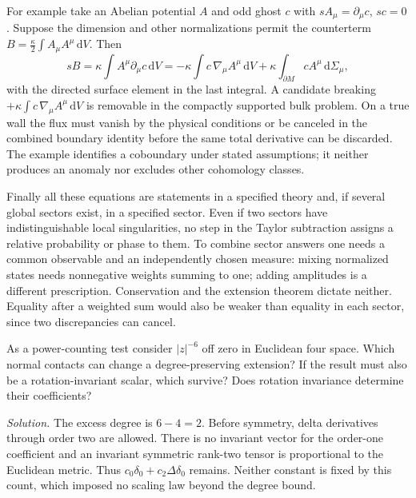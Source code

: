 For example take an Abelian potential $A$ and odd ghost $c$ with
$sA_\mu=\partial_\mu c$, $sc=0$. Suppose the dimension and other
normalizations permit the counterterm $B=\tfrac\kappa2\int A_\mu A^\mu\,\mathrm{d}V$.
Then
\[
 sB=\kappa\int A^\mu\partial_\mu c\,\mathrm{d}V
   =-\kappa\int c\,\nabla_\mu A^\mu\,\mathrm{d}V
      +\kappa\int_{\partial M} c A^\mu\,\mathrm{d}\Sigma_\mu ,
\]
with the directed surface element in the last integral. A candidate
breaking $+\kappa\int c\,\nabla_\mu A^\mu\,\mathrm{d}V$ is removable in
the compactly supported bulk problem. On a true wall the flux must vanish
by the physical conditions or be canceled in the combined boundary
identity before the same total derivative can be discarded. The example
identifies a coboundary under stated assumptions; it neither produces an
anomaly nor excludes other cohomology classes.

Finally all these equations are statements in a specified theory and, if
several global sectors exist, in a specified sector. Even if two sectors
have indistinguishable local singularities, no step in the Taylor
subtraction assigns a relative probability or phase to them. To combine
sector answers one needs a common observable and an independently chosen
measure: mixing normalized states needs nonnegative weights summing to
one; adding amplitudes is a different prescription. Conservation and the
extension theorem dictate neither. Equality after a weighted sum would
also be weaker than equality in each sector, since two discrepancies can
cancel.

\begin{exercise}
As a power-counting test consider $|z|^{-6}$ off zero in Euclidean four
space. Which normal contacts can change a degree-preserving extension?
If the result must also be a rotation-invariant scalar, which survive?
Does rotation invariance determine their coefficients?
\end{exercise}
\noindent\emph{Solution.} The excess degree is $6-4=2$. Before symmetry,
delta derivatives through order two are allowed. There is no invariant
vector for the order-one coefficient and an invariant symmetric
rank-two tensor is proportional to the Euclidean metric. Thus
$c_0\delta_0+c_2\Delta\delta_0$ remains. Neither constant is fixed by
this count, which imposed no scaling law beyond the degree bound.
